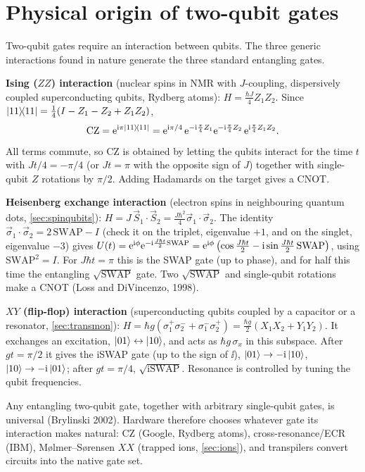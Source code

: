\section{Physical origin of two-qubit gates}
Two-qubit gates require an interaction between qubits. The three generic interactions found in nature generate the three standard entangling gates.
\begin{origin}
\textbf{Ising ($ZZ$) interaction} (nuclear spins in NMR with $J$-coupling, dispersively coupled superconducting qubits, Rydberg atoms): $H=\frac{\hbar J}{4}Z_1Z_2$. Since
$\left|11\middle\rangle\!\middle\langle11\right|=\frac14(I-Z_1-Z_2+Z_1Z_2)$,
\begin{equation}
  \mathrm{CZ}=\mathrm e^{\mathrm i\pi\left|11\middle\rangle\!\middle\langle11\right|}=\mathrm e^{\mathrm i\pi/4}\,\mathrm e^{-\mathrm i\frac\pi4Z_1}\mathrm e^{-\mathrm i\frac\pi4Z_2}\,\mathrm e^{\mathrm i\frac\pi4Z_1Z_2}.
\end{equation}
All terms commute, so CZ is obtained by letting the qubits interact for the time $t$ with $Jt/4=-\pi/4$ (or $Jt=\pi$ with the opposite sign of $J$) together with single-qubit $Z$ rotations
by $\pi/2$. Adding Hadamards on the target gives a CNOT.

\textbf{Heisenberg exchange interaction} (electron spins in neighbouring quantum dots, \cref{sec:spinqubits}): $H=J\,\vec S_1\cdot\vec S_2=\frac{J\hbar^2}4\vec\sigma_1\cdot\vec\sigma_2$. The
identity $\vec\sigma_1\cdot\vec\sigma_2=2\,\mathrm{SWAP}-I$ (check it on the triplet, eigenvalue $+1$, and on the singlet, eigenvalue $-3$) gives
$U(t)=\mathrm e^{\mathrm i\phi}\mathrm e^{-\mathrm i\frac{J\hbar t}2\mathrm{SWAP}}=\mathrm e^{\mathrm i\phi}\left(\cos\frac{J\hbar t}2-\mathrm i\sin\frac{J\hbar t}2\,\mathrm{SWAP}\right)$, using $\mathrm{SWAP}^2=I$. For $J\hbar t=\pi$ this is the
SWAP gate (up to phase), and for half this time the entangling $\sqrt{\mathrm{SWAP}}$ gate. Two $\sqrt{\mathrm{SWAP}}$ and single-qubit rotations make a CNOT (Loss and DiVincenzo, 1998).

\textbf{$XY$ (flip-flop) interaction} (superconducting qubits coupled by a capacitor or a resonator, \cref{sec:transmon}): $H=\hbar g(\sigma_1^+\sigma_2^-+\sigma_1^-\sigma_2^+)=\frac{\hbar g}2(X_1X_2+Y_1Y_2)$.
It exchanges an excitation, $\left|01\right\rangle\leftrightarrow\left|10\right\rangle$, and acts as $\hbar g\,\sigma_x$ in this subspace. After $gt=\pi/2$ it gives the iSWAP gate (up to the sign of $\ii$),
$\left|01\right\rangle\to-\mathrm i\left|10\right\rangle$, $\left|10\right\rangle\to-\mathrm i\left|01\right\rangle$; after $gt=\pi/4$, $\sqrt{\mathrm{iSWAP}}$. Resonance is controlled by tuning the qubit frequencies.
\end{origin}
Any entangling two-qubit gate, together with arbitrary single-qubit gates, is universal (Brylinski 2002). Hardware therefore chooses whatever gate its interaction makes natural: CZ
(Google, Rydberg atoms), cross-resonance/ECR (IBM), Mølmer--Sørensen $XX$ (trapped ions, \cref{sec:ions}), and transpilers convert circuits into the native gate set.

